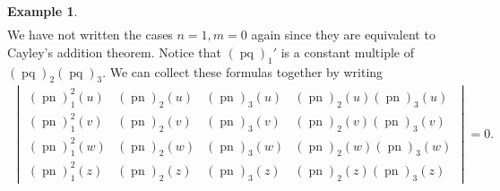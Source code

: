\documentclass{amsart}
\theoremstyle{definition}
\newtheorem{example}[theorem]{Example}
\DeclareMathOperator{\pq}{pq}
\DeclareMathOperator{\pn}{pn}
\begin{document}
\begin{example}
\begin{align*}
\end{align*}
We have not written the cases $n=1, m=0$ again since they are equivalent to Cayley's addition theorem. Notice that $(\pq)_1'$ is a constant multiple of $(\pq)_2(\pq)_3$. We can collect these formulas together by writing
\begin{align*}
    \begin{vmatrix}
(\pn)_1^2 (u) & (\pn)_2 (u) & (\pn)_3 (u) & (\pn)_2(u)(\pn)_3(u) \\
(\pn)_1^2 (v) & (\pn)_2 (v) & (\pn)_3 (v) & (\pn)_2(v)(\pn)_3(v) \\
(\pn)_1^2 (w) & (\pn)_2 (w) & (\pn)_3 (w) & (\pn)_2(w)(\pn)_3(w) \\
(\pn)_1^2 (z) & (\pn)_2 (z) & (\pn)_3 (z) & (\pn)_2(z)(\pn)_3(z) 
\end{vmatrix}=0.
\end{align*}
\end{example}
\end{document}
